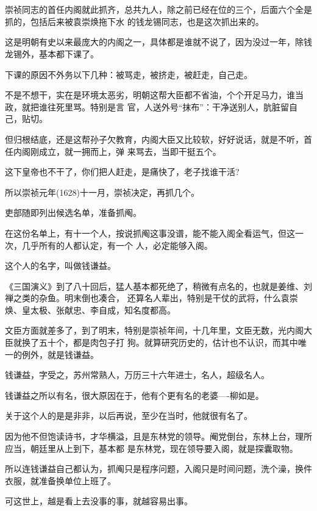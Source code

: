 \documentclass[11pt,a4paper,onecolumn]{article}
\begin{document}
\section[\thesection]{}

崇祯同志的首任内阁就此抓齐，总共九人，除之前已经在位的三个，后面六个全是抓的，包括后来被袁崇焕拖下水
的钱龙锡同志，也是这次抓出来的。

这是明朝有史以来最庞大的内阁之一，具体都是谁就不说了，因为没过一年，除钱龙锡外，基本都下课了。

下课的原因不外务以下几种：被骂走，被挤走，被赶走，自己走。

不是不想干，实在是环境太恶劣，明朝这帮大臣都不省油，个个开足马力，谁当政，就把谁往死里骂。特别是言
官，人送外号``抹布''：干净送别人，肮脏留自己，贴切。

但归根结底，还是这帮孙子欠教育，内阁大臣又比较软，好好说话，就是不听，首任内阁刚成立，就一拥而上，弹
来骂去，当即干挺五个。

这下皇帝也不干了，你们把人赶走，是痛快了，老子找谁干活?

所以崇祯元年(1628)十一月，崇祯决定，再抓几个。

吏部随即列出候选名单，准备抓阄。

在这份名单上，有十一个人，按说抓阄这事没谱，能不能入阁全看运气，但这一次，几乎所有的人都认定，有一个
人，必定能够入阁。

这个人的名字，叫做钱谦益。

《三国演义》到了八十回后，猛人基本都死绝了，稍微有点名的，也就是姜维、刘禅之类的杂鱼。明末倒也凑合，
还算名人辈出，特别是干仗的武将，什么袁崇焕、皇太极、张献忠、李自成，知名度都高。

文臣方面就差多了，到了明末，特别是崇祯年间，十几年里，文臣无数，光内阁大臣就换了五十个，都是肉包子打
狗。就算研究历史的，估计也不认识，而其中唯一的例外，就是钱谦益。

钱谦益，字受之，苏州常熟人，万历三十六年进士，名人，超级名人。

钱谦益之所以有名，很大原因在于，他有个更有名的老婆----柳如是。

关于这个人的是是非非，以后再说，至少在当时，他就很有名了。

因为他不但饱读诗书，才华横溢，且是东林党的领导。阉党倒台，东林上台，理所应当，朝廷里从上到下，基本都
是东林党，现在领导要入阁，就是探囊取物。

所以连钱谦益自己都认为，抓阄只是程序问题，入阁只是时间问题，洗个澡，换件衣服，就准备换单位上班了。

可这世上，越是看上去没事的事，就越容易出事。
\end{document}
